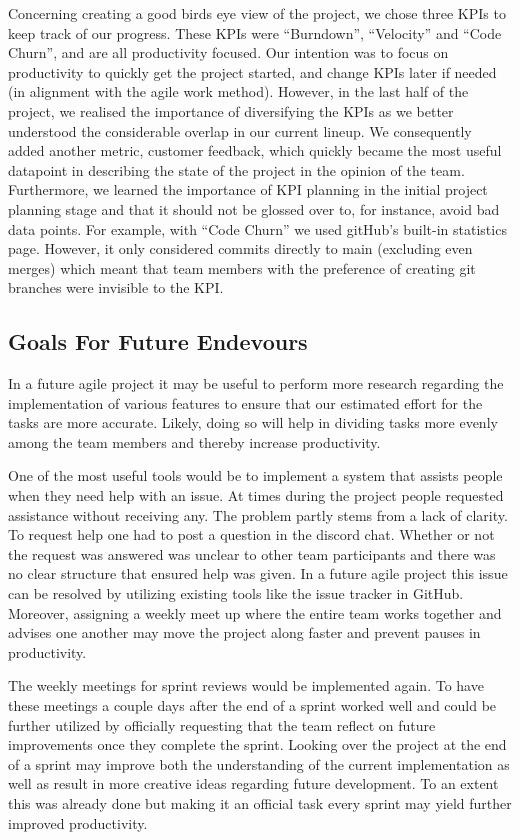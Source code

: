Concerning creating a good birds eye view of the project, we chose three KPIs to keep track of our progress. These KPIs were “Burndown”, “Velocity” and “Code Churn”, and are all productivity focused. Our intention was to focus on productivity to quickly get the project started, and change KPIs later if needed (in alignment with the agile work method). However, in the last half of the project, we realised the importance of diversifying the KPIs as we better understood the considerable overlap in our current lineup. We consequently added another metric, customer feedback, which quickly became the most useful datapoint in describing the state of the project in the opinion of the team. Furthermore, we learned the importance of KPI planning in the initial project planning stage and that it should not be glossed over to, for instance, avoid bad data points. For example, with “Code Churn” we used gitHub’s built-in statistics page. However, it only considered commits directly to main (excluding even merges) which meant that team members with the preference of creating git branches were invisible to the KPI. 


\subsection{Goals For Future Endevours}
In a future agile project it may be useful to perform more research regarding the implementation of various features to ensure that our estimated effort for the tasks are more accurate. Likely, doing so will help in dividing tasks more evenly among the team members and thereby increase productivity.

One of the most useful tools would be to implement a system that assists people when they need help with an issue. At times during the project people requested assistance without receiving any. The problem partly stems from a lack of clarity. To request help one had to post a question in the discord chat. Whether or not the request was answered was unclear to other team participants and there was no clear structure that ensured help was given. In a future agile project this issue can be resolved by utilizing existing tools like the issue tracker in GitHub. Moreover, assigning a weekly meet up where the entire team works together and advises one another may move the project along faster and prevent pauses in productivity.

The weekly meetings for sprint reviews would be implemented again. To have these meetings a couple days after the end of a sprint worked well and could be further utilized by officially requesting that the team reflect on future improvements once they complete the sprint. Looking over the project at the end of a sprint may improve both the understanding of the current implementation as well as result in more creative ideas regarding future development. To an extent this was already done but making it an official task every sprint may yield further improved productivity. 

